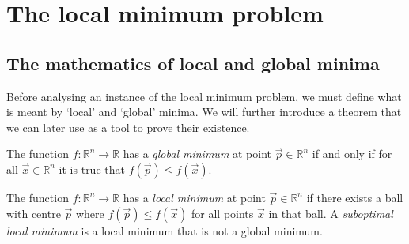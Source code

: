 \chapter{The local minimum problem}
\label{sec:local_minimum_problem}

\section{The mathematics of local and global minima}
Before analysing an instance of the local minimum problem, we must define what is meant by `local' and `global' minima.
We will further introduce a theorem that we can later use as a tool to prove their existence.
\begin{definition}
    \label{def:global_minimum}
    The function $f: \mathbb{R}^n \rightarrow \mathbb{R}$ has a \textit{global minimum} at point
    $\vec{p} \in \mathbb{R}^n$
    if and only if for all
    $\vec{x} \in \mathbb{R}^n$
    it is true that
    $f(\vec{p}) \leq f(\vec{x})$.
\end{definition}

\begin{definition}
    \label{def:local_minimum}
    The function $f: \mathbb{R}^n \rightarrow \mathbb{R}$ has a \textit{local minimum} at point
    $\vec{p} \in \mathbb{R}^n$
    if there exists a ball with centre
    $\vec{p}$
    where
    $f(\vec{p}) \leq f(\vec{x})$
    for all points $\vec{x}$ in that ball.
    A \textit{suboptimal local minimum} is a local minimum that is not a global minimum.
\end{definition}


